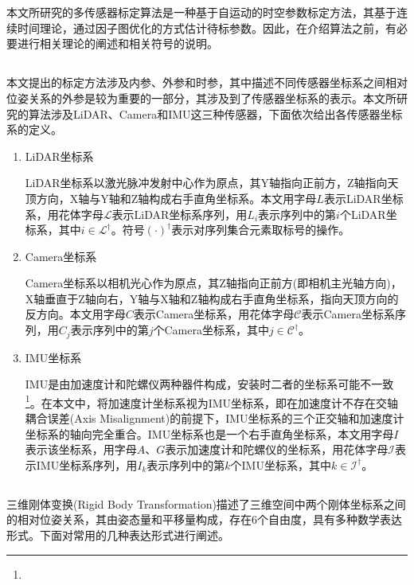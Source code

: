 
\chapter{}
本文所研究的多传感器标定算法是一种基于自运动的时空参数标定方法，其基于连续时间理论，通过因子图优化的方式估计待标参数。因此，在介绍算法之前，有必要进行相关理论的阐述和相关符号的说明。

\section{}
本文提出的标定方法涉及内参、外参和时参，其中描述不同传感器坐标系之间相对位姿关系的外参是较为重要的一部分，其涉及到了传感器坐标系的表示。本文所研究的算法涉及LiDAR、Camera和IMU这三种传感器，下面依次给出各传感器坐标系的定义。
\begin{enumerate}
  \item LiDAR坐标系

        LiDAR坐标系以激光脉冲发射中心作为原点，其Y轴指向正前方，Z轴指向天顶方向，X轴与Y轴和Z轴构成右手直角坐标系。本文用字母$L$表示LiDAR坐标系，用花体字母$\mathcal{L}$表示LiDAR坐标系序列，用$L_i$表示序列中的第$i$个LiDAR坐标系，其中$i\in\mathcal{L}^\dagger$。符号$(\cdot)^\dagger$表示对序列集合元素取标号的操作。
  \item Camera坐标系

        Camera坐标系以相机光心作为原点，其Z轴指向正前方(即相机主光轴方向)，X轴垂直于Z轴向右，Y轴与X轴和Z轴构成右手直角坐标系，指向天顶方向的反方向。本文用字母$C$表示Camera坐标系，用花体字母$\mathcal{C}$表示Camera坐标系序列，用$C_j$表示序列中的第$j$个Camera坐标系，其中$j\in\mathcal{C}^\dagger$。
  \item IMU坐标系

        IMU是由加速度计和陀螺仪两种器件构成，安装时二者的坐标系可能不一致\footnote{}。在本文中，将加速度计坐标系视为IMU坐标系，即在加速度计不存在交轴耦合误差(Axis Misalignment)的前提下，IMU坐标系的三个正交轴和加速度计坐标系的轴向完全重合。IMU坐标系也是一个右手直角坐标系，本文用字母$I$表示该坐标系，用字母$A$、$G$表示加速度计和陀螺仪的坐标系，用花体字母$\mathcal{I}$表示IMU坐标系序列，用$I_k$表示序列中的第$k$个IMU坐标系，其中$k\in\mathcal{I}^\dagger$。
\end{enumerate}
\section{}
三维刚体变换(Rigid Body Transformation)描述了三维空间中两个刚体坐标系之间的相对位姿关系，其由姿态量和平移量构成，存在6个自由度，具有多种数学表达形式。下面对常用的几种表达形式进行阐述。
